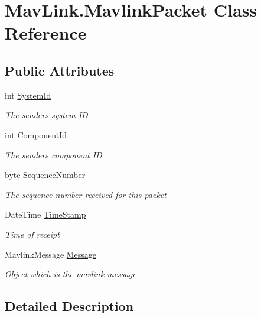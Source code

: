 \hypertarget{classMavLink_1_1MavlinkPacket}{}\section{Mav\+Link.\+Mavlink\+Packet Class Reference}
\label{classMavLink_1_1MavlinkPacket}
\subsection*{Public Attributes}
\begin{DoxyCompactItemize}
\item 
int \mbox{\hyperlink{classMavLink_1_1MavlinkPacket_ae10478e1f7182b45c452c7ce8cb14016}{System\+Id}}
\begin{DoxyCompactList}\small\item\em The sender\textquotesingle{}s system ID \end{DoxyCompactList}\item 
int \mbox{\hyperlink{classMavLink_1_1MavlinkPacket_a757b10451bbb36de712e50898097ce76}{Component\+Id}}
\begin{DoxyCompactList}\small\item\em The sender\textquotesingle{}s component ID \end{DoxyCompactList}\item 
byte \mbox{\hyperlink{classMavLink_1_1MavlinkPacket_a02bc9d9153a2b3df8e343488c78bfe9d}{Sequence\+Number}}
\begin{DoxyCompactList}\small\item\em The sequence number received for this packet \end{DoxyCompactList}\item 
Date\+Time \mbox{\hyperlink{classMavLink_1_1MavlinkPacket_a41ba9c38f178fadebcc0efebe42a94a2}{Time\+Stamp}}
\begin{DoxyCompactList}\small\item\em Time of receipt \end{DoxyCompactList}\item 
Mavlink\+Message \mbox{\hyperlink{classMavLink_1_1MavlinkPacket_addf815b76e6685627f91584450130035}{Message}}
\begin{DoxyCompactList}\small\item\em Object which is the mavlink message \end{DoxyCompactList}\end{DoxyCompactItemize}


\subsection{Detailed Description}


